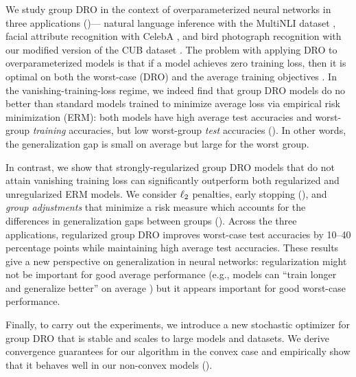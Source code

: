 We study group DRO in the context of overparameterized neural networks in three applications ()---%
natural language inference with the MultiNLI dataset \citep{williams2018broad},
facial attribute recognition with CelebA \citep{liu2015deep},
and bird photograph recognition with our modified version of the CUB dataset \citep{wah2011cub}.
The problem with applying DRO to overparameterized models is that if a model achieves zero training loss, then it is optimal on both the worst-case (DRO) and the average training objectives \citep{zhang2017understanding, wen2014robust}.
In the vanishing-training-loss regime,
we indeed find that group DRO models do no better than standard models trained to minimize average loss via empirical risk minimization (ERM):
both models have high average test accuracies and worst-group \emph{training} accuracies, but low worst-group \emph{test} accuracies ().
In other words, the generalization gap is small on average but large for the worst group.

In contrast, we show that strongly-regularized group DRO models that do not attain vanishing training loss can significantly outperform both regularized and unregularized ERM models.
We consider $\ell_2$ penalties, early stopping (),
and \emph{group adjustments} that minimize a risk measure which accounts
for the differences in generalization gaps between groups ().
Across the three applications, regularized group DRO improves worst-case test accuracies by 10--40 percentage points
while maintaining high average test accuracies.
These results give a new perspective on generalization in neural networks:
regularization might not be important for good average performance
(e.g., models can ``train longer and generalize better'' on average \citep{hoffer2017train}) but it appears important for good worst-case performance.

Finally, to carry out the experiments, we introduce a new stochastic optimizer for group DRO
that is stable and scales to large models and datasets.
We derive convergence guarantees for our algorithm in the convex case and empirically show that it behaves well in our non-convex models ().
